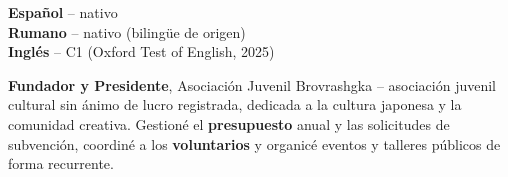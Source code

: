 \documentclass[9pt]{developercv} %
\begin{document}
\begin{minipage}[t]{0.42\textwidth} %
	\vspace{-\baselineskip} %

	\textbf{Español} -- nativo\\
	\textbf{Rumano} -- nativo (bilingüe de origen)\\
	\textbf{Inglés} -- C1 (Oxford Test of English, 2025)
\end{minipage}
\hfill %
\begin{minipage}[t]{0.52\textwidth} %
	\vspace{-\baselineskip} %

	\textbf{Fundador y Presidente}, Asociación Juvenil Brovrashgka -- asociación juvenil cultural sin ánimo de lucro registrada, dedicada a la cultura japonesa y la comunidad creativa. Gestioné el \textbf{presupuesto} anual y las solicitudes de subvención, coordiné a los \textbf{voluntarios} y organicé eventos y talleres públicos de forma recurrente.
\end{minipage}
\end{document}
